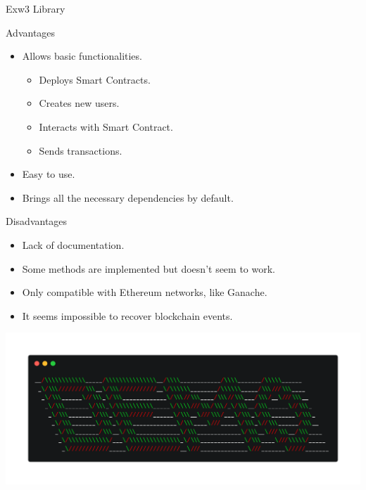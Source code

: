 \documentclass{beamer}
\begin{document}
\begin{frame}{Exw3 Library}
	\begin{exampleblock}{\scriptsize Advantages}
    \begin{itemize}
      \item {\footnotesize Allows basic functionalities.}
        \begin{itemize}
          \item {\footnotesize Deploys Smart Contracts.}
          \item {\footnotesize Creates new users.}
          \item {\footnotesize Interacts with Smart Contract.}
          \item {\footnotesize Sends transactions.}
        \end{itemize}
      \item {\footnotesize Easy to use.}
      \item {\footnotesize Brings all the necessary dependencies by default.}
    \end{itemize}
	\end{exampleblock}
	\begin{alertblock}{\scriptsize Disadvantages}
    \begin{itemize}
      \item {\footnotesize Lack of documentation.}
      \item {\footnotesize Some methods are implemented but doesn't seem to work.}
      \item {\footnotesize Only compatible with Ethereum networks, like Ganache.}
      \item {\footnotesize It seems impossible to recover blockchain events.}
    \end{itemize}
	\end{alertblock}
\end{frame}

\begin{frame}
  \begin{center}
  \includegraphics[scale=0.15]{Images/demo.png}
  \end{center}
\end{frame}
\end{document}

